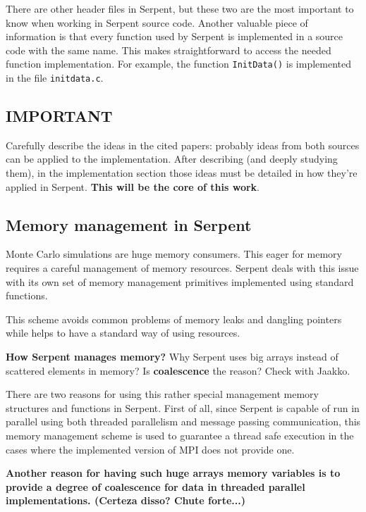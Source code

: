 \documentclass[twoside,a4paper,12pt,english,draft]{anstrans}
\begin{document}
There are other header files in Serpent, but these two are the most important to know when working
in Serpent source code. Another valuable piece of information is that every function used by Serpent
is implemented in a source code with the same name. This makes straightforward to access the needed
function implementation. For example, the function \texttt{InitData()} is implemented in the file
\texttt{initdata.c}.

\subsection{IMPORTANT}
Carefully describe the ideas in the cited papers: probably ideas from both sources can be applied to
the implementation. After describing (and deeply studying them), in the implementation section those
ideas must be detailed in how they're applied in Serpent. \textbf{This will be the core of this work}.

\subsection{Memory management in Serpent}

Monte Carlo simulations are huge memory consumers. This eager for memory requires a careful
management of memory resources. Serpent deals with this issue with its own set of memory
management primitives implemented using standard functions.

This scheme avoids common problems of memory leaks and dangling pointers while helps to
have a standard way of using resources.

\textbf{How Serpent manages memory?}
Why Serpent uses big arrays instead of scattered elements in memory?
Is \textbf{coalescence} the reason? Check with Jaakko.

There are two reasons for using this rather special management memory
structures and functions in Serpent. First of all, since Serpent is
capable of run in parallel using both threaded parallelism and
message passing communication, this memory management scheme is
used to guarantee a thread safe execution in the cases where
the implemented version of MPI does not provide one.

\textbf{Another reason for having such huge arrays memory variables is to
provide a degree of coalescence for data in threaded parallel implementations.
(Certeza disso? Chute forte...)}

%
\end{document}
